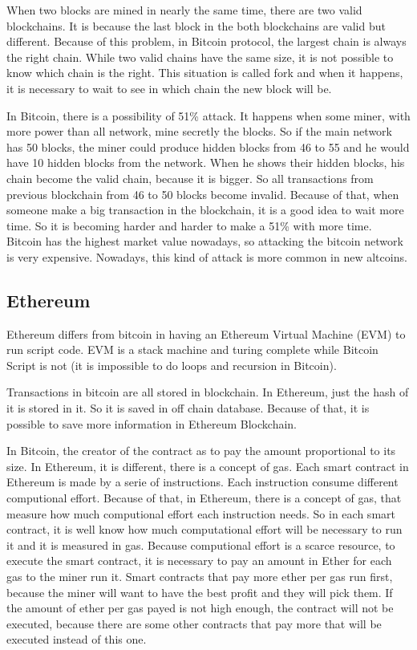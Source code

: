 \documentclass[12pt]{article}
\begin{document}
When two blocks are mined in nearly the same time, there are two valid blockchains.
It is because the last block in the both blockchains are valid but different.
Because of this problem, in Bitcoin protocol, the largest chain is always the right chain.
While two valid chains have the same size, it is not possible to know which chain is the right.
This situation is called fork and when it happens, it is necessary to wait to see in which chain the new block will be.

In Bitcoin, there is a possibility of 51\% attack.
It happens when some miner, with more power than all network, mine secretly the blocks.
So if the main network has 50 blocks, the miner could produce hidden blocks from 46 to 55
and he would have 10 hidden blocks from the network.
When he shows their hidden blocks, his chain become the valid chain, because it is bigger.
So all transactions from previous blockchain from 46 to 50 blocks become invalid.
Because of that, when someone make a big transaction in the blockchain, it is a good idea to wait more time.
So it is becoming harder and harder to make a 51\% with more time.
Bitcoin has the highest market value nowadays, so attacking the bitcoin network is very expensive.
Nowadays, this kind of attack is more common in new altcoins.

\subsection{Ethereum}

Ethereum differs from bitcoin in having an Ethereum Virtual Machine (EVM) to run script code.
EVM is a stack machine and turing complete while Bitcoin Script is not
(it is impossible to do loops and recursion in Bitcoin).

Transactions in bitcoin are all stored in blockchain.
In Ethereum, just the hash of it is stored in it.
So it is saved in off chain database.
Because of that, it is possible to save more information in Ethereum Blockchain.

In Bitcoin, the creator of the contract as to pay the amount proportional to its size.
In Ethereum, it is different, there is a concept of gas.
Each smart contract in Ethereum is made by a serie of instructions.
Each instruction consume different computional effort.
Because of that, in Ethereum, there is a concept of gas, that measure how much computional effort
each instruction needs.
So in each smart contract, it is well know how much computational effort will be necessary to run it
and it is measured in gas.
Because computional effort is a scarce resource, to execute the smart contract, it is necessary to
pay an amount in Ether for each gas to the miner run it.
Smart contracts that pay more ether per gas run first, because the miner will want to have the best
profit and they will pick them.
If the amount of ether per gas payed is not high enough, the contract will not be executed,
because there are some other contracts that pay more that will be executed instead of this one.
\end{document}
